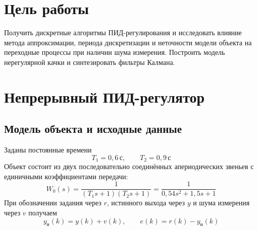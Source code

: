 
\setlength{\abovedisplayskip}{7pt}
\setlength{\belowdisplayskip}{7pt}
\setlength{\abovedisplayshortskip}{4pt}
\setlength{\belowdisplayshortskip}{4pt}

\makeatletter
\newenvironment{reportfigure}{%
  \par\addvspace{8pt}\noindent
  \begin{minipage}{\textwidth}
    \def\@captype{figure}%
    \centering
}{%
  \end{minipage}\par\vspace{4pt}
}
\makeatother

\tableofcontents
\newpage

\section{Цель работы}

Получить дискретные алгоритмы ПИД-регулирования и исследовать влияние
метода аппроксимации, периода дискретизации и неточности модели объекта
на переходные процессы при наличии шума измерения.
Построить модель нерегулярной качки и синтезировать фильтры Калмана.

\section{Непрерывный ПИД-регулятор}

\subsection{Модель объекта и исходные данные}

Заданы постоянные времени
\begin{equation}
  T_1=0{,}6\,\text{с},\qquad T_2=0{,}9\,\text{с}
  \label{eq:plant-data}
\end{equation}
Объект состоит из двух последовательно соединённых апериодических звеньев
с единичными коэффициентами передачи:
\begin{equation}
  W_0(s)=\frac{1}{(T_1s+1)(T_2s+1)}
    =\frac{1}{0{,}54s^2+1{,}5s+1}
  \label{eq:plant-transfer}
\end{equation}
При обозначении задания через $r$, истинного выхода через $y$
и шума измерения через $v$ получаем
\begin{equation}
  y_{\text{и}}(k)=y(k)+v(k),
  \qquad e(k)=r(k)-y_{\text{и}}(k)
  \label{eq:measurement-error}
\end{equation}

